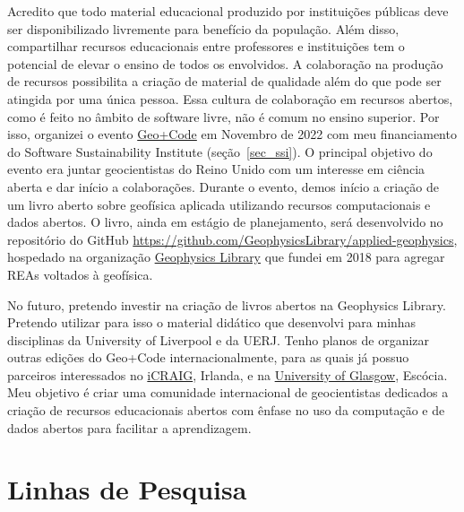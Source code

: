 \documentclass[10pt,a4paper,oneside]{book}
\begin{document}
Acredito que todo material educacional produzido por instituições públicas deve
ser disponibilizado livremente para benefício da população.
Além disso, compartilhar recursos educacionais entre professores e instituições
tem o potencial de elevar o ensino de todos os envolvidos.
A colaboração na produção de recursos possibilita a criação de material de
qualidade além do que pode ser atingida por uma única pessoa.
Essa cultura de colaboração em recursos abertos, como é feito no âmbito
de software livre, não é comum no ensino superior.
Por isso, organizei o evento
\href{https://hackmd.io/@leouieda/uk-geo-code-meetup}{Geo+Code} em Novembro de
2022 com meu financiamento do Software Sustainability Institute
(seção~\ref{sec_ssi}).
O principal objetivo do evento era juntar geocientistas do Reino Unido com um
interesse em ciência aberta e dar início a colaborações.
Durante o evento, demos início a criação de um livro aberto sobre geofísica
aplicada utilizando recursos computacionais e dados abertos.
O livro, ainda em estágio de planejamento, será desenvolvido no repositório
do GitHub \url{https://github.com/GeophysicsLibrary/applied-geophysics},
hospedado na organização \href{https://github.com/GeophysicsLibrary}{Geophysics Library}
que fundei em 2018 para agregar REAs voltados à geofísica.

No futuro, pretendo investir na criação de livros abertos na Geophysics
Library.
Pretendo utilizar para isso o material didático que desenvolvi para minhas
disciplinas da University of Liverpool e da UERJ.
Tenho planos de organizar outras edições do Geo+Code internacionalmente,
para as quais já possuo parceiros interessados no
\href{https://www.icrag-centre.org/}{iCRAIG}, Irlanda, e na
\href{https://www.gla.ac.uk/}{University of Glasgow}, Escócia.
Meu objetivo é criar uma comunidade internacional de geocientistas dedicados a
criação de recursos educacionais abertos com ênfase no uso da computação e de
dados abertos para facilitar a aprendizagem.


\chapter{Linhas de Pesquisa}
\label{cap_pesquisa}
\end{document}
